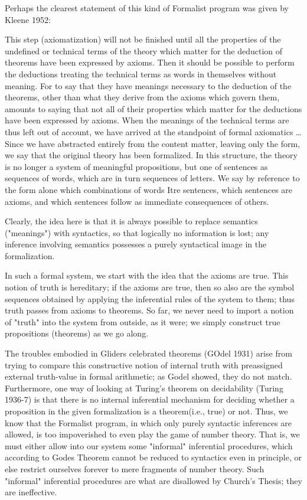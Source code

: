 \documentclass[a4paper,12pt]{article}
\begin{document}
Perhaps the clearest statement of this kind of Formalist program was given by Kleene 1952:

This step (axiomatization) will not be finished until all the properties of the
undefined or technical terms of the theory which matter for the deduction
of theorems have been expressed by axioms. Then it should be possible to
perform the deductions treating the technical terms as words in themselves
without meaning.  For to say that they have meanings necessary to the deduction
of the theorems, other than what they derive from the axioms which
govern them, amounts to saying that not all of their properties which matter
for the deductions have been expressed by axioms. When the meanings
of the technical terms are thus left out of account, we have arrived at the
standpoint of formal axiomatics \ldots Since we have abstracted entirely from
the content matter, leaving only the form, we say that the original theory has
been formalized. In this structure, the theory is no longer a system of meaningful
propositions, but one of sentences as sequences of words, which are
in turn sequences of letters.  We say by reference to the form alone which
combinations of words Itre sentences, which sentences are axioms, and which
sentences follow as immediate consequences of others.

Clearly, the idea here is that it is always possible to replace semantics ("meanings")
with syntactics, so that logically no information is lost; any inference involving semantics
possesses a purely syntactical image in the formalization.

In such a formal system, we start with the idea that the axioms are true.
This notion of truth is hereditary; if the axioms are true, then so also are the
symbol sequences obtained by applying the inferential rules of the system to them;
thus truth passes from axioms to theorems. So far, we never need to import a notion of "truth"
into the system from outside, as it were; we simply construct true propositions (theorems)
as we go along.

The troubles embodied in Gliders celebrated theorems (GOdel 1931)
arise from trying to compare this constructive notion of internal truth with
preassigned external truth-value in formal arithmetic; as Godel showed, they
do not match. Furthermore, one way of looking at Turing's theorem on decidability (Turing 1936-7)
is that there is no internal inferential mechanism for deciding whether a proposition
in the given formalization is a theorem(i.e., true) or not. Thus, we know that the Formalist program,
in which only purely syntactic inferences are allowed, is too impoverished to even play the game of number theory.
That is, we must either allow into our system some "informal" inferential procedures, which according to Godes Theorem
cannot be reduced to syntactics even in principle, or else restrict ourselves forever to mere fragments of number theory.
Such "informal" inferential procedures are what are disallowed by Church's Thesis; they are ineffective.
\end{document}
